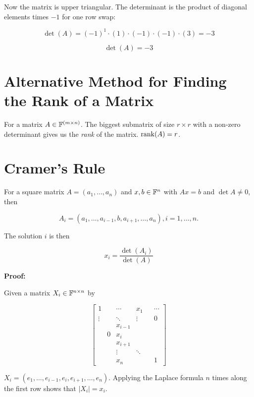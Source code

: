 Now the matrix is upper triangular. The determinant is the product of diagonal elements times \( -1 \) for one row swap:

\[
    \det(A) = {(-1)}^1 \cdot (1) \cdot (-1) \cdot (-1) \cdot (3) = -3
\]

\[
    \det(A) = -3
\]

\section{Alternative Method for Finding the Rank of a Matrix}

For a matrix \(A \in \mathbb{F}^{(m \times n)}\). The biggest submatrix of size \(r \times r\) with a
non-zero determinant gives us the \emph{rank} of the matrix. \(\mathrm{rank}(A) = r\).

\section{Cramer's Rule}

For a square matrix \(A = (a_1, \dots, a_n)\) and \(x,b \in \mathbb{F}^{n}\) with \(Ax = b\) and \(\det A \ne 0\),
then

\[
    A_i = (a_1, \dots, a_{i - 1}, b, a_{i + 1}, \dots, a_n), i = 1,\dots,n.
\]

The solution \(i\) is then

\[
    x_i = \frac{\det(A_i)}{\det(A)}
\]

\textbf{Proof:}

Given a matrix \(X_i \in \mathbb{F}^{n \times n}\) by

\[
    \begin{bmatrix}
        1      &   & \cdots    & x_1    &  & \cdots \\
        \vdots &   & \ddots    & \vdots &  & 0      \\
               &   & x_{i - 1} &        &  &        \\
               & 0 & x_i       &        &  &        \\
               &   & x_{i + 1} &        &  &        \\
               &   & \vdots    & \ddots &  &        \\
               &   & x_n       &        &  & 1
    \end{bmatrix}
\]

\(X_i = (e_1, \dots, e_{i - 1}, e_i, e_{i + 1}, \dots, e_n)\). Applying the Laplace formula \(n\) times along the first row shows that \(|X_i| = x_i\).

